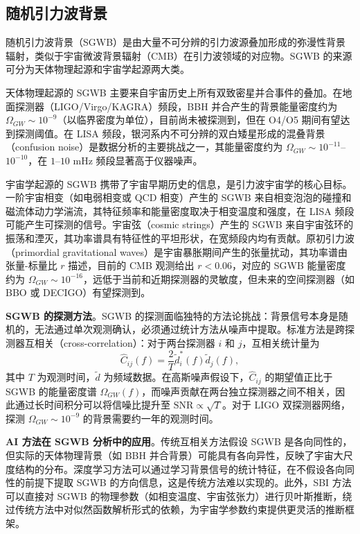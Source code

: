 \subsection{随机引力波背景}

随机引力波背景（SGWB）是由大量不可分辨的引力波源叠加形成的弥漫性背景辐射，类似于宇宙微波背景辐射（CMB）在引力波领域的对应物。SGWB 的来源可分为天体物理起源和宇宙学起源两大类。

天体物理起源的 SGWB 主要来自宇宙历史上所有双致密星并合事件的叠加。在地面探测器（LIGO/Virgo/KAGRA）频段，BBH 并合产生的背景能量密度约为 $\Omega_{GW} \sim 10^{-9}$（以临界密度为单位），目前尚未被探测到，但在 O4/O5 期间有望达到探测阈值。在 LISA 频段，银河系内不可分辨的双白矮星形成的混叠背景（confusion noise）是数据分析的主要挑战之一，其能量密度约为 $\Omega_{GW} \sim 10^{-11}$--$10^{-10}$，在 $1$--$10$ mHz 频段显著高于仪器噪声。

宇宙学起源的 SGWB 携带了宇宙早期历史的信息，是引力波宇宙学的核心目标。一阶宇宙相变（如电弱相变或 QCD 相变）产生的 SGWB 来自相变泡泡的碰撞和磁流体动力学湍流，其特征频率和能量密度取决于相变温度和强度，在 LISA 频段可能产生可探测的信号。宇宙弦（cosmic strings）产生的 SGWB 来自宇宙弦环的振荡和湮灭，其功率谱具有特征性的平坦形状，在宽频段内均有贡献。原初引力波（primordial gravitational waves）是宇宙暴胀期间产生的张量扰动，其功率谱由张量-标量比 $r$ 描述，目前的 CMB 观测给出 $r < 0.06$，对应的 SGWB 能量密度约为 $\Omega_{GW} \sim 10^{-16}$，远低于当前和近期探测器的灵敏度，但未来的空间探测器（如 BBO 或 DECIGO）有望探测到。

\textbf{SGWB 的探测方法}。SGWB 的探测面临独特的方法论挑战：背景信号本身是随机的，无法通过单次观测确认，必须通过统计方法从噪声中提取。标准方法是跨探测器互相关（cross-correlation）：对于两台探测器 $i$ 和 $j$，互相关统计量为
\begin{equation}
  \hat{C}_{ij}(f) = \frac{2}{T} \tilde{d}_i^*(f) \tilde{d}_j(f),
\end{equation}
其中 $T$ 为观测时间，$\tilde{d}$ 为频域数据。在高斯噪声假设下，$\hat{C}_{ij}$ 的期望值正比于 SGWB 的能量密度谱 $\Omega_{GW}(f)$，而噪声贡献在两台独立探测器之间不相关，因此通过长时间积分可以将信噪比提升至 $\text{SNR} \propto \sqrt{T}$。对于 LIGO 双探测器网络，探测 $\Omega_{GW} \sim 10^{-9}$ 的背景需要约一年的观测时间。

\textbf{AI 方法在 SGWB 分析中的应用}。传统互相关方法假设 SGWB 是各向同性的，但实际的天体物理背景（如 BBH 并合背景）可能具有各向异性，反映了宇宙大尺度结构的分布。深度学习方法可以通过学习背景信号的统计特征，在不假设各向同性的前提下提取 SGWB 的方向信息，这是传统方法难以实现的。此外，SBI 方法可以直接对 SGWB 的物理参数（如相变温度、宇宙弦张力）进行贝叶斯推断，绕过传统方法中对似然函数解析形式的依赖，为宇宙学参数约束提供更灵活的推断框架。

